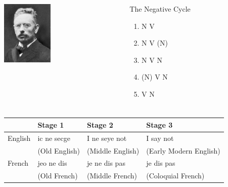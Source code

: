 \documentclass[compress]{beamer}
\begin{document}
\begin{frame}
\frametitle{\cite{jespersen:1917}}
\begin{columns}[T]  
   \begin{column}{.25\textwidth}
	  \vspace{8pt}
	  \includegraphics[height=1.2in]{jespersen.jpg}   
   \end{column}
   \begin{column}{.7\textwidth}
      \begin{block}{The Negative Cycle}
	\begin{enumerate}
	     \item N V
	     \item N V (N)
	     \item N V N
	     \item (N) V N
	     \item V N
	\end{enumerate}
      \end{block}
    \end{column}
  \end{columns}
\end{frame}

\begin{frame}
\frametitle{\cite{jespersen:1917}}
\begin{center}
\begin{tabular}{@{}lp{3cm}p{3cm}p{2.5cm}@{}}
\hline
 & Stage 1 & Stage 2 & Stage 3\\
\hline
English & ic ne secge & I ne seye not & I say not\\
& (Old English) & (Middle English) & (Early Modern English)\\
\hline
French & jeo ne dis & je ne dis pas & je dis pas \\
& (Old French) & (Middle French) & (Coloquial French) \\
\hline
\end{tabular}\label{table1}
\end{center}
\end{frame}
\end{document}
